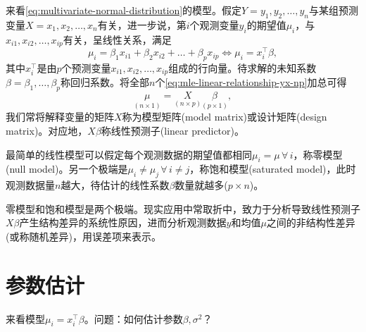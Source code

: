 来看\eqref{eq:multivariate-normal-distribution}的模型。假定$Y = y_{1}, y_{2}, \ldots, y_{n}$与某组预测变量$X = x_{1}, x_{2}, \ldots, x_{n}$有关，进一步说，第$i$个观测变量$y_{i}$的期望值$\mu_{i}$，与$x_{i1}, x_{i2}, \ldots, x_{ip}$有关，呈线性关系，满足
\begin{equation}
  \label{eq:mle-linear-relationship-yx-np}
  \mu_{i} = \beta_{1} x_{i1} + \beta_{2} x_{i2} + \ldots + \beta_{p} x_{ip} \Longleftrightarrow \mu_{i} = x_{i}^{\top} \beta,
\end{equation}
其中$x_{i}^{\top}$是由$p$个预测变量$x_{i1}, x_{i2}, \ldots ,x_{ip}$组成的行向量。待求解的未知系数$\beta = \beta_{1}, \ldots, \beta_{p}$称回归系数。将全部$n$个\eqref{eq:mle-linear-relationship-yx-np}加总可得
\begin{equation}
  \label{eq:mle-linear-relationship-mu-x-beta}
  \underset{\left( n \times 1 \right)}{\mu} =
  \underset{\left( n \times p \right)}{X}
  \underset{\left( p \times 1 \right)}{\beta},
\end{equation}
我们常将解释变量的矩阵$X$称为模型矩阵(model matrix)或设计矩阵(design matrix)。对应地，$X \beta$称线性预测子(linear predictor)。

最简单的线性模型可以假定每个观测数据的期望值都相同$\mu_{i} = \mu \, \forall \, i$，称零模型(null model)。另一个极端是$\mu_{i} \neq \mu_{j} \, \forall \, i \neq j$，称饱和模型(saturated model)，此时观测数据量$n$越大，待估计的线性系数$\beta$数量就越多($p \times n$)。

零模型和饱和模型是两个极端。现实应用中常取折中，致力于分析导致线性预测子$X \beta$产生结构差异的系统性原因，进而分析观测数据$y$和均值$\mu$之间的非结构性差异(或称随机差异)，用误差项来表示。

\section{参数估计}
\label{sec:mle-parameter-estimation}
来看模型$\mu_{i} = x_{i}^{\top} \beta$。问题：如何估计参数$\beta, \sigma^{2}$？

